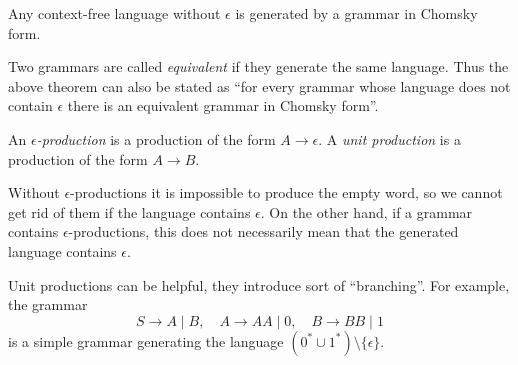 \begin{page}
\setcounter{section}{5}
\setcounter{subsection}{2}
\setcounter{dfn}{6}
\label{portion:1091}

\begin{thm}
\label{thm:ChomskyForm}
Any context-free language without $\epsilon$ is generated by a grammar in Chomsky form.
\end{thm}

\end{page}

\begin{page}
\setcounter{section}{5}
\setcounter{subsection}{2}
\setcounter{dfn}{6}
\label{portion:1092}


Two grammars are called \emph{equivalent} if they generate the same language.
Thus the above theorem can also be stated as
``for every grammar whose language does not contain $\epsilon$ there is an equivalent grammar in Chomsky form''.


\end{page}

\begin{page}
\setcounter{section}{5}
\setcounter{subsection}{2}
\setcounter{dfn}{7}
\label{portion:1094}

\begin{dfn}
An \emph{$\epsilon$-production} is a production of the form $A \to \epsilon$.
A \emph{unit production} is a production of the form $A \to B$.
\end{dfn}

\end{page}

\begin{page}
\setcounter{section}{5}
\setcounter{subsection}{2}
\setcounter{dfn}{7}
\label{portion:1095}


Without $\epsilon$-productions it is impossible to produce the empty word,
so we cannot get rid of them if the language contains $\epsilon$.
On the other hand, if a grammar contains $\epsilon$-productions,
this does not necessarily mean that the generated language contains $\epsilon$.

Unit productions can be helpful, they introduce sort of ``branching''. For example, the grammar
\[
S \to A \mid B, \quad A \to AA \mid 0, \quad B \to BB \mid 1
\]
is a simple grammar generating the language $(0^* \cup 1^*) \setminus \{\epsilon\}$.



\end{page}

